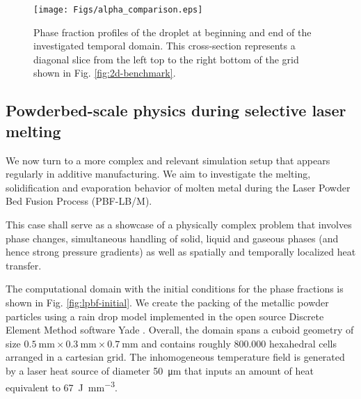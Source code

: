 \documentclass[conference,final,a4paper]{IEEEtran}
\begin{document}
\begin{figure}[!tbp]
  \centering
  \texttt{[image: Figs/alpha\_comparison.eps]}
  \caption{Phase fraction profiles of the droplet at beginning and end of the investigated temporal domain. This cross-section represents a diagonal slice from the left top to the right bottom of the grid shown in Fig. \ref{fig:2d-benchmark}.}
  \label{fig:alpha-comparison}
\end{figure}

\subsection{Powderbed-scale physics during selective laser melting}\label{sec:lpbf}

We now turn to a more complex and relevant simulation setup that appears regularly in additive manufacturing. We aim to investigate the melting, solidification and evaporation behavior of molten metal during the Laser Powder Bed Fusion Process (PBF-LB/M).

This case shall serve as a showcase of a physically complex problem that involves phase changes, simultaneous handling of solid, liquid and gaseous phases (and hence strong pressure gradients) as well as spatially and temporally localized heat transfer.

The computational domain with the initial conditions for the phase fractions is shown in Fig. \ref{fig:lpbf-initial}. We create the packing of the metallic powder particles using a rain drop model implemented in the open source Discrete Element Method software Yade \cite{vaclavsmilauerYadeDocumentation2021}. Overall, the domain spans a cuboid geometry of size $\SI{0.5}{\milli\metre} \times \SI{0.3}{\milli\metre} \times \SI{0.7}{\milli\metre}$ and contains roughly 800.000 hexahedral cells arranged in a cartesian grid. The inhomogeneous temperature field is generated by a laser heat source of diameter \SI{50}{\micro\metre} that inputs an amount of heat equivalent to \SI{67}{\joule \per \milli\metre\cubed}.
\end{document}
